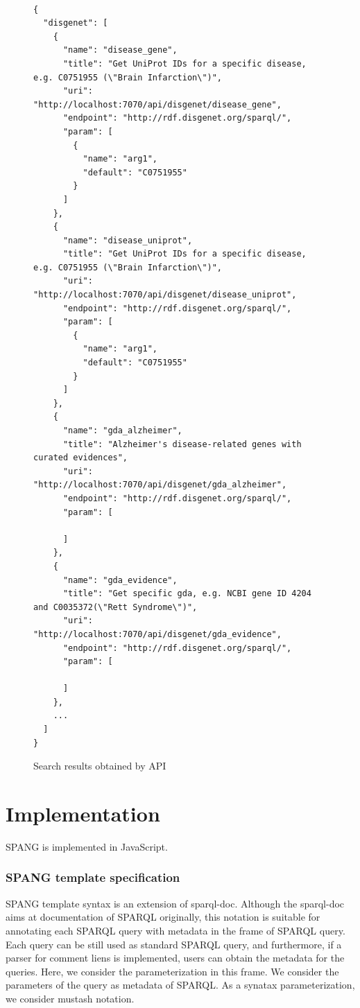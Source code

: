 \documentclass[runningheads]{llncs}
\begin{document}
\begin{figure}[!t]
\begin{scriptsize}
\begin{verbatim}

{
  "disgenet": [
    {
      "name": "disease_gene",
      "title": "Get UniProt IDs for a specific disease, e.g. C0751955 (\"Brain Infarction\")",
      "uri": "http://localhost:7070/api/disgenet/disease_gene",
      "endpoint": "http://rdf.disgenet.org/sparql/",
      "param": [
        {
          "name": "arg1",
          "default": "C0751955"
        }
      ]
    },
    {
      "name": "disease_uniprot",
      "title": "Get UniProt IDs for a specific disease, e.g. C0751955 (\"Brain Infarction\")",
      "uri": "http://localhost:7070/api/disgenet/disease_uniprot",
      "endpoint": "http://rdf.disgenet.org/sparql/",
      "param": [
        {
          "name": "arg1",
          "default": "C0751955"
        }
      ]
    },
    {
      "name": "gda_alzheimer",
      "title": "Alzheimer's disease-related genes with curated evidences",
      "uri": "http://localhost:7070/api/disgenet/gda_alzheimer",
      "endpoint": "http://rdf.disgenet.org/sparql/",
      "param": [

      ]
    },
    {
      "name": "gda_evidence",
      "title": "Get specific gda, e.g. NCBI gene ID 4204 and C0035372(\"Rett Syndrome\")",
      "uri": "http://localhost:7070/api/disgenet/gda_evidence",
      "endpoint": "http://rdf.disgenet.org/sparql/",
      "param": [

      ]
    },
    ...
  ]
}

\end{verbatim}
\end{scriptsize}
\caption{Search results obtained by API}
\label{fig:example-rdf}
\end{figure}

\section{Implementation}
SPANG is implemented in JavaScript.

\subsubsection{SPANG template specification}
SPANG template syntax is an extension of sparql-doc. Although the sparql-doc aims at documentation of SPARQL originally, this notation is suitable for annotating each SPARQL query with metadata in the frame of SPARQL query. Each query can be still used as standard SPARQL query, and furthermore, if a parser for comment liens is implemented, users can obtain the metadata for the queries.
Here, we consider the parameterization in this frame. We consider the parameters of the query as metadata of SPARQL.
As a synatax parameterization, we consider mustash notation.
\end{document}
